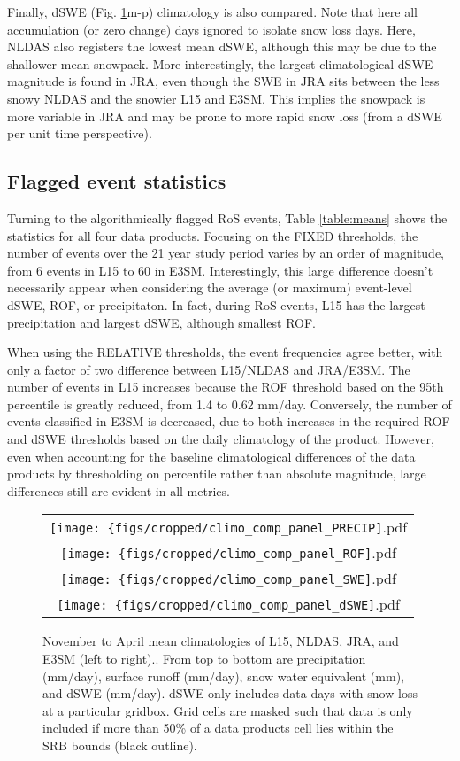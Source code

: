 \documentclass[draft]{agujournal2019}
\begin{document}
Finally, dSWE (Fig. \ref{fig:means}m-p) climatology is also compared. Note that here all accumulation (or zero change) days ignored to isolate snow loss days. Here, NLDAS also registers the lowest mean dSWE, although this may be due to the shallower mean snowpack. More interestingly, the largest climatological dSWE magnitude is found in JRA, even though the SWE in JRA sits between the less snowy NLDAS and the snowier L15 and E3SM. This implies the snowpack is more variable in JRA and may be prone to more rapid snow loss (from a dSWE per unit time perspective).

\subsection{Flagged event statistics}

Turning to the algorithmically flagged RoS events, Table \ref{table:means} shows the statistics for all four data products. Focusing on the FIXED thresholds, the number of events over the 21 year study period varies by an order of magnitude, from 6 events in L15 to 60 in E3SM. Interestingly, this large difference doesn't necessarily appear when considering the average (or maximum) event-level dSWE, ROF, or precipitaton. In fact, during RoS events, L15 has the largest precipitation and largest dSWE, although smallest ROF.

When using the RELATIVE thresholds, the event frequencies agree better, with only a factor of two difference between L15/NLDAS and JRA/E3SM. The number of events in L15 increases because the ROF threshold based on the 95th percentile is greatly reduced, from 1.4 to 0.62 mm/day. Conversely, the number of events classified in E3SM is decreased, due to both increases in the required ROF and dSWE thresholds based on the daily climatology of the product. However, even when accounting for the baseline climatological differences of the data products by thresholding on percentile rather than absolute magnitude, large differences still are evident in all metrics.

\begin{figure}
\begin{tabular}{c}
\texttt{[image: \{figs/cropped/climo\_comp\_panel\_PRECIP]}.pdf} \\
\texttt{[image: \{figs/cropped/climo\_comp\_panel\_ROF]}.pdf} \\
\texttt{[image: \{figs/cropped/climo\_comp\_panel\_SWE]}.pdf} \\
\texttt{[image: \{figs/cropped/climo\_comp\_panel\_dSWE]}.pdf}
\end{tabular}
\caption{November to April mean climatologies of L15, NLDAS, JRA, and E3SM (left to right).. From top to bottom are precipitation (mm/day), surface runoff (mm/day), snow water equivalent (mm), and dSWE (mm/day). dSWE only includes data days with snow loss at a particular gridbox. Grid cells are masked such that data is only included if more than 50\% of a data products cell lies within the SRB bounds (black outline).}
\label{fig:means}
\end{figure}
\end{document}
